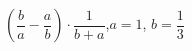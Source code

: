 \begin{ex}[type=expr_calc]
	\begin{condition}
		\( \left(\dfrac{b}{a}-\dfrac{a}{b}\right)\cdot\dfrac{1}{b+a} \), \( a=1 \), \( b=\dfrac{1}{3} \)
	\end{condition}
\end{ex}